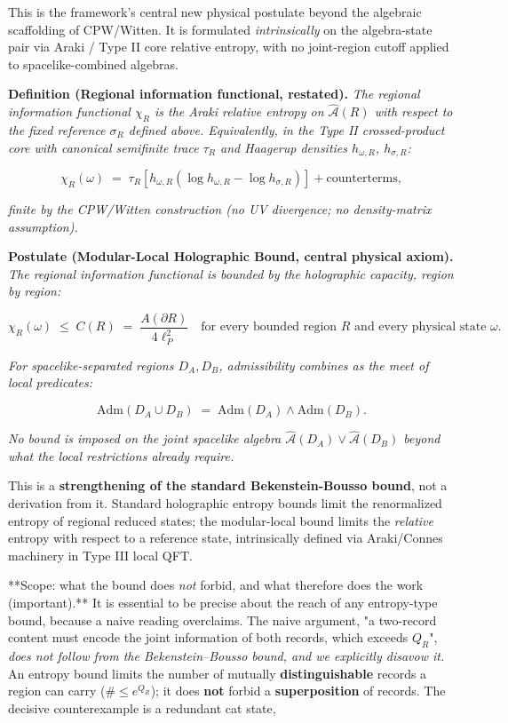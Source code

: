 \documentclass[11pt,a4paper]{article}
\begin{document}
This is the framework's central new physical postulate beyond the algebraic scaffolding of CPW/Witten. It is formulated \emph{intrinsically} on the algebra-state pair via Araki / Type II core relative entropy, with no joint-region cutoff applied to spacelike-combined algebras.

\textbf{Definition (Regional information functional, restated).} \emph{The regional information functional $\chi_R$ is the Araki relative entropy on $\hat{\mathcal{A}}(R)$ with respect to the fixed reference $\sigma_R$ defined above. Equivalently, in the Type II crossed-product core with canonical semifinite trace $\tau_R$ and Haagerup densities $h_{\omega, R}$, $h_{\sigma, R}$:}

\[
\chi_R(\omega) \;=\; \tau_R\!\left[ h_{\omega, R} \left( \log h_{\omega, R} - \log h_{\sigma, R} \right) \right] + \text{counterterms},
\]

\emph{finite by the CPW/Witten construction (no UV divergence; no density-matrix assumption).}

\textbf{Postulate (Modular-Local Holographic Bound, central physical axiom).} \emph{The regional information functional is bounded by the holographic capacity, region by region:}

\[
\boxed{\chi_R(\omega) \;\le\; C(R) \;=\; \frac{A(\partial R)}{4\ell_P^2} \quad \text{for every bounded region } R \text{ and every physical state } \omega.}
\]

\emph{For spacelike-separated regions $D_A, D_B$, admissibility combines as the meet of local predicates:}

\[
\mathrm{Adm}(D_A \cup D_B) \;=\; \mathrm{Adm}(D_A) \wedge \mathrm{Adm}(D_B).
\]

\emph{No bound is imposed on the joint spacelike algebra $\hat{\mathcal{A}}(D_A) \vee \hat{\mathcal{A}}(D_B)$ beyond what the local restrictions already require.}

This is a \textbf{strengthening of the standard Bekenstein-Bousso bound}, not a derivation from it. Standard holographic entropy bounds limit the renormalized entropy of regional reduced states; the modular-local bound limits the \emph{relative} entropy with respect to a reference state, intrinsically defined via Araki/Connes machinery in Type III local QFT.

**Scope: what the bound does \emph{not} forbid, and what therefore does the work (important).** It is essential to be precise about the reach of any entropy-type bound, because a naive reading overclaims. The naive argument, "a two-record content must encode the joint information of both records, which exceeds $Q_R$", \emph{does not follow from the Bekenstein–Bousso bound, and we explicitly disavow it.} An entropy bound limits the number of mutually \textbf{distinguishable} records a region can carry ($\# \le e^{Q_R}$); it does \textbf{not} forbid a \textbf{superposition} of records. The decisive counterexample is a redundant cat state,
\end{document}

